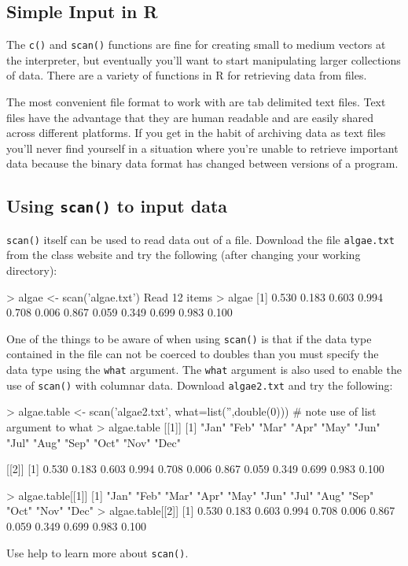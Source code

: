\subsection{Simple Input in R}

The \lstinline!c()! and \lstinline!scan()! functions are fine for
creating small to medium vectors at the interpreter, but eventually
you'll want to start manipulating larger collections of data. There are
a variety of functions in R for retrieving data from files.

The most convenient file format to work with are tab delimited text
files. Text files have the advantage that they are human readable and
are easily shared across different platforms. If you get in the habit of
archiving data as text files you'll never find yourself in a situation
where you're unable to retrieve important data because the binary data
format has changed between versions of a program.

\subsection{Using \lstinline!scan()! to input data}

\lstinline!scan()! itself can be used to read data out of a file.
Download the file \lstinline!algae.txt! from the class website and try
the following (after changing your working directory):

\begin{R}
> algae <- scan('algae.txt')
Read 12 items
> algae
 [1] 0.530 0.183 0.603 0.994 0.708 0.006 0.867 0.059 0.349 0.699 0.983 0.100
\end{R}
One of the things to be aware of when using \lstinline!scan()! is that
if the data type contained in the file can not be coerced to doubles
than you must specify the data type using the \lstinline!what! argument.
The \lstinline!what! argument is also used to enable the use of
\lstinline!scan()! with columnar data. Download \lstinline!algae2.txt!
and try the following:

\begin{R}
> algae.table <- scan('algae2.txt', what=list('',double(0)))
                        # note use of list argument to what
> algae.table
[[1]]
 [1] "Jan" "Feb" "Mar" "Apr" "May" "Jun" "Jul" "Aug" "Sep" "Oct" "Nov" "Dec"

[[2]]
 [1] 0.530 0.183 0.603 0.994 0.708 0.006 0.867 0.059 0.349 0.699 0.983 0.100

> algae.table[[1]]
 [1] "Jan" "Feb" "Mar" "Apr" "May" "Jun" "Jul" "Aug" "Sep" "Oct" "Nov" "Dec"
> algae.table[[2]]
 [1] 0.530 0.183 0.603 0.994 0.708 0.006 0.867 0.059 0.349 0.699 0.983 0.100
\end{R}
Use help to learn more about \lstinline!scan()!.

